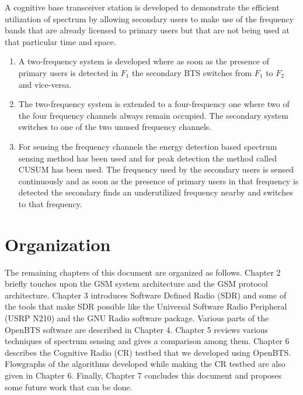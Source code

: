 A cognitive base transceiver station is developed to demonstrate the efficient 
utilization of spectrum by allowing secondary users to make use of the 
frequency bands that are already licensed to primary users but that are not 
being used at that particular time and space.

\begin{enumerate}
    \item A two-frequency system is developed where as soon as the presence of 
    primary users is detected in $F_1$  the secondary BTS switches from $F_1$ 
    to $F_2$ and vice-versa.
    \item The two-frequency system is extended to a four-frequency one where
    two of the four frequency channels always remain occupied. The secondary
    system switches to one of the two unused frequency channels.
    \item For sensing the frequency channels the energy detection based
    spectrum sensing method has been used and for peak detection the method 
    called CUSUM has been used. The frequency used by the secondary users is
    sensed continuously and as soon as the presence of primary users in that 
    frequency is detected the secondary finds an underutilized frequency 
    nearby and switches to that frequency.  
\end{enumerate}



\section{Organization}
The remaining chapters of this document are organized as follows. Chapter 2 
briefly touches upon the GSM system architecture and the GSM protocol 
architecture. Chapter 3 introduces Software Defined Radio (SDR) and some of the
tools that make SDR possible like the Universal Software Radio Peripheral 
(USRP N210) and the GNU Radio software package. Various parts of the OpenBTS 
software are described in Chapter 4. Chapter 5 reviews various techniques of 
spectrum sensing and gives a comparison among them. Chapter 6 describes the 
Cognitive Radio (CR) testbed that we developed using OpenBTS. Flowgraphs of
the algorithms developed while making the CR testbed are also given in
Chapter 6. Finally, Chapter 7 concludes this document and proposes some future
work that can be done.

